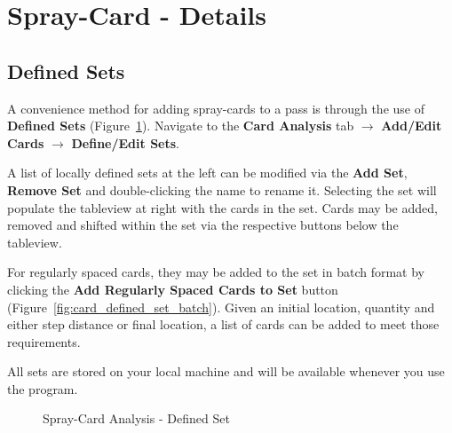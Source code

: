 \documentclass[10pt,letterpaper,titlepage]{article}
\begin{document}
    \newpage

    \section{Spray-Card - Details}

    \subsection{Defined Sets}
    \label{sec:defined_sets}
    A convenience method for adding spray-cards to a pass is through the use of \textbf{Defined Sets} (Figure~\ref{fig:card_defined_set}). Navigate to the \textbf{Card Analysis} tab $\rightarrow$ \textbf{Add/Edit Cards} $\rightarrow$ \textbf{Define/Edit Sets}.\par
    A list of locally defined sets at the left can be modified via the \textbf{Add Set}, \textbf{Remove Set} and double-clicking the name to rename it. Selecting the set will populate the tableview at right with the cards in the set. Cards may be added, removed and shifted within the set via the respective buttons below the tableview.\par
    For regularly spaced cards, they may be added to the set in batch format by clicking the \textbf{Add Regularly Spaced Cards to Set} button (Figure~\ref{fig:card_defined_set_batch}). Given an initial location, quantity and either step distance or final location, a list of cards can be added to meet those requirements.\par
    All sets are stored on your local machine and will be available whenever you use the program.
    \begin{figure}[hb]
        \centering
        \caption{Spray-Card Analysis - Defined Set}
        \label{fig:card_defined_set}
    \end{figure}
\end{document}
